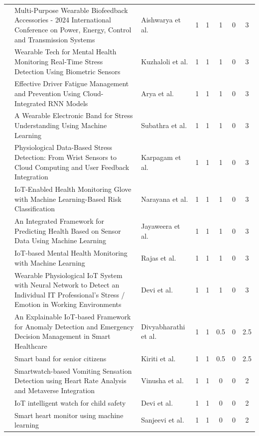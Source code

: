 \begin{center}
\begin{longtable}{p{1.5cm} p{4cm} p{2.0cm} c c c c c}
\cite{aishwarya2024} & Multi-Purpose Wearable Biofeedback Accessories - 2024 International Conference on Power, Energy, Control and Transmission Systems & Aishwarya et al. & 1 & 1 & 1 & 0 & 3 \\
\cite{kuzhaloli2025} & Wearable Tech for Mental Health Monitoring Real-Time Stress Detection Using Biometric Sensors  & Kuzhaloli et al. & 1 & 1 & 1 & 0 & 3 \\
\cite{arya2024} & Effective Driver Fatigue Management and Prevention Using Cloud-Integrated RNN Models & Arya et al. & 1 & 1 & 1 & 0 & 3 \\
\cite{subathra2025} & A Wearable Electronic Band for Stress Understanding Using Machine Learning & Subathra et al. & 1 & 1 & 1 & 0 & 3 \\
\cite{karpagam2024} & Physiological Data-Based Stress Detection: From Wrist Sensors to Cloud Computing and User Feedback Integration & Karpagam et al. & 1 & 1 & 1 & 0 & 3 \\
\cite{narayana2025} & IoT-Enabled Health Monitoring Glove with Machine Learning-Based Risk Classification & Narayana et al. & 1 & 1 & 1 & 0 & 3 \\
\cite{jayaweera2020} & An Integrated Framework for Predicting Health Based on Sensor Data Using Machine Learning  & Jayaweera et al. & 1 & 1 & 1 & 0 & 3 \\

\cite{rajas2025} & IoT-based Mental Health Monitoring with Machine Learning  & Rajas et al. & 1 & 1 & 1 & 0 & 3 \\
\cite{devi2023} & Wearable Physiological IoT System with Neural Network to Detect an Individual IT Professional’s Stress / Emotion in Working Environments & Devi et al. & 1 & 1 & 1 & 0 & 3 \\
\cite{divyabharathi2025} & An Explainable IoT-based Framework for Anomaly Detection and Emergency Decision Management in Smart Healthcare  & Divyabharathi et al. & 1 & 1 & 0.5 & 0 & 2.5 \\
\cite{kiriti2022} & Smart band for senior citizens & Kiriti et al. & 1 & 1 & 0.5 & 0 & 2.5 \\
\cite{vinusha2023} & Smartwatch-based Vomiting Sensation Detection using Heart Rate Analysis and Metaverse Integration  & Vinusha et al. & 1 & 1 & 0 & 0 & 2 \\
\cite{devi2025} & IoT intelligent watch for child safety & Devi et al. & 1 & 1 & 0 & 0 & 2 \\

\cite{sanjeevi2024} & Smart heart monitor using machine learning & Sanjeevi et al. & 1 & 1 & 0 & 0 & 2 \\

\end{longtable}
\end{center}
\endgroup


